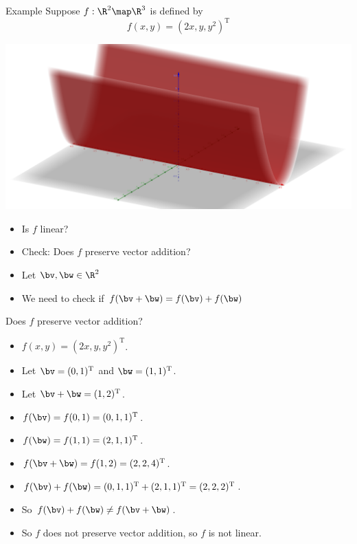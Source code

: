 \documentclass{beamer}
\begin{document}
\begin{frame}{Example}
Suppose $f:\R^2\map\R^3$ is defined by
$$f(x,y) = (2x, y, y^2)^{\text{T}}$$

\includegraphics[scale=0.1]{z-equals-y-squared}

\begin{itemize}
\item Is $f$ linear?
\item Check: Does $f$ preserve vector addition?
\item Let $\bv, \bw \in \R^2$
\item We need to check if $f(\bv + \bw) = f(\bv) + f(\bw)$
\end{itemize}
\end{frame}



\begin{frame}{Does $f$ preserve vector addition?}
\begin{itemize}
\item $f(x,y) = (2x, y, y^2)^{\text{T}}$.
\item Let $\bv = (0,1)^{\text{T}}$ and $\bw = (1,1)^{\text{T}}$.
\item Let $\bv+\bw = (1,2)^{\text{T}}$.
\item $f(\bv) = f(0,1) = (0,1,1)^{\text{T}}$.
\item $f(\bw) = f(1,1) = (2,1,1)^{\text{T}}$.
\item $f(\bv+\bw) = f(1,2) = (2,2,4)^{\text{T}}$.
\item $f(\bv) + f(\bw) = (0,1,1)^{\text{T}} + (2,1,1)^{\text{T}} = (2,2,2)^{\text{T}}$.
\item So $f(\bv) + f(\bw) \not= f(\bv +\bw)$.
\item So $f$ does not preserve vector addition, so $f$ is not linear.
\end{itemize}
\end{frame}
\end{document}
